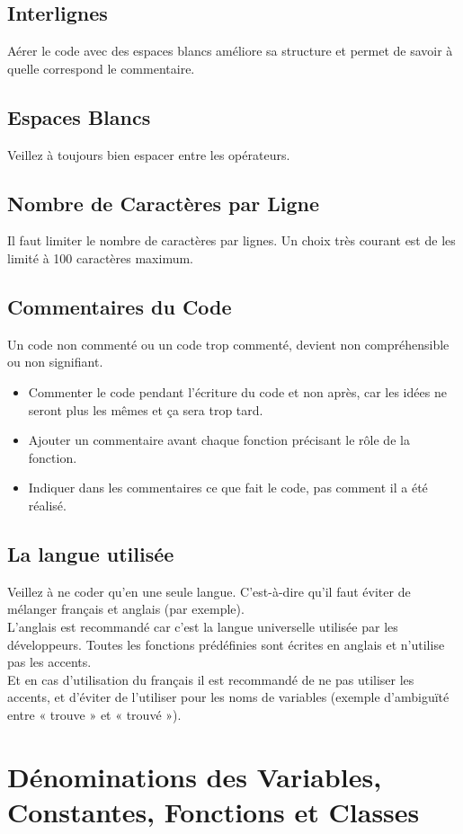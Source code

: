 \documentclass[11pt,fleqn]{book} %
\begin{document}
\subsection{Interlignes}
 Aérer le code avec des espaces blancs améliore sa structure et permet de savoir à quelle 
correspond le commentaire.
\subsection{Espaces Blancs}
Veillez à toujours bien espacer entre les opérateurs.


\subsection{ Nombre de Caractères par Ligne}
 Il faut limiter le nombre de caractères par lignes. Un choix très courant est de les limité à 100 caractères maximum.
 
 
\subsection{Commentaires du Code}
 Un code non commenté ou un code trop commenté, devient non compréhensible ou non signifiant.
\begin{itemize}
    \item Commenter le code pendant l’écriture du code et non après, car les idées ne seront plus les mêmes et ça sera trop tard.
    \item Ajouter un commentaire avant chaque fonction précisant le rôle de la fonction.
    \item Indiquer dans les commentaires ce que fait le code, pas comment il a été réalisé.
\end{itemize}
\subsection{La langue utilisée}
 Veillez à ne coder qu'en une seule langue. C'est-à-dire qu'il faut éviter de mélanger français et 
anglais (par exemple). \\
 L’anglais est recommandé car c'est la langue universelle utilisée par les développeurs. Toutes 
les fonctions prédéfinies sont écrites en anglais et n’utilise pas les accents.\\
 Et en cas d’utilisation du français il est recommandé de ne pas utiliser les accents, et d’éviter de l’utiliser pour les noms de variables (exemple d’ambiguïté entre « trouve » et « trouvé »).
 
 
 \section{Dénominations des Variables, Constantes, 
Fonctions et Classes}
\end{document}
